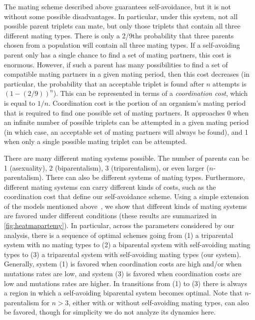 \documentclass{report}
\begin{document}
The mating scheme described above guarantees self-avoidance, but it is not without some possible disadvantages. In particular, under this system, not all possible parent triplets can mate, but only those triplets that contain all three different mating types. There is only a 2/9ths probability that three parents chosen from a population will contain all three mating types. If a self-avoiding parent only has a single chance to find a set of mating partners, this cost is enormous. However, if such a parent has many possibilities to find a set of compatible mating partners in a given mating period, then this cost decreases (in particular, the probability that an acceptable triplet is found after $n$ attempts is $(1-(2/9))^n$). This can be represented in terms of a \emph{coordination cost}, which is equal to $1/n$.  Coordination cost is the portion of an organism’s mating period that is required to find one possible set of mating partners. It approaches 0 when an infinite number of possible triplets can be attempted in a given mating period (in which case, an acceptable set of mating partners will always be found), and 1 when only a single possible mating triplet can be attempted.

There are many different mating systems possible. The number of parents can be 1 (asexuality), 2 (biparentalism), 3 (triparentalism), or even larger ($n$-parentalism). There can also be different systems of mating types. Furthermore, different mating systems can carry different kinds of costs, such as the coordination cost that define our self-avoidance scheme. Using a simple extension of the models mentioned above~\cite{perry_why_2017,kondrashov_selection_1982}, we show that different kinds of mating systems are favored under different conditions (these results are summarized in \cref{fig:heatmapartemy}). In particular, across the parameters considered by our analysis, there is a sequence of optimal schemes going from (1) a triparental system with no mating types to (2) a biparental system with self-avoiding mating types to (3) a triparental system with self-avoiding mating types (our system). Generally, system (1) is favored when coordination costs are high and/or when mutations rates are low, and system (3) is favored when coordination costs are low and mutations rates are higher. In transitions from (1) to (3) there is always a region in which a self-avoiding biparental system becomes optimal. Note that $n$-parentalism for $n>3$, either with or without self-avoiding mating types, can also be favored, though for simplicity we do not analyze its dynamics here. 
\end{document}
